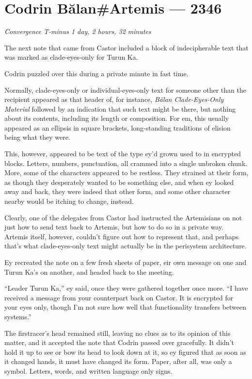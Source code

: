 \hypertarget{codrin-bux103lanartemis-2346}{%
\chapter{Codrin Bălan\#Artemis — 2346}\label{codrin-bux103lanartemis-2346}}

\begin{center}
\emph{Convergence T-minus 1 day, 2 hours, 32 minutes}
\end{center}

\noindent The next note that came from Castor included a block of indecipherable text that was marked as clade-eyes-only for Turun Ka.

Codrin puzzled over this during a private minute in fast time.

Normally, clade-eyes-only or individual-eyes-only text for someone other than the recipient appeared as that header of, for instance, \emph{Bălan Clade-Eyes-Only Material} followed by an indication that such text might be there, but nothing about its contents, including its length or composition. For em, this usually appeared as an ellipsis in square brackets, long-standing traditions of elision being what they were.

This, however, appeared to be text of the type ey'd grown used to in encrypted blocks. Letters, numbers, punctuation, all crammed into a single unbroken chunk. More, some of the characters appeared to be restless. They strained at their form, as though they desperately wanted to be something else, and when ey looked away and back, they were indeed that other form, and some other character nearby would be itching to change, instead.

Clearly, one of the delegates from Castor had instructed the Artemisians on not just how to send text back to Artemis, but how to do so in a private way. Artemis itself, however, couldn't figure out how to represent that, and perhaps that's what clade-eyes-only text might actually be in the perisystem architecture.

Ey recreated the note on a few fresh sheets of paper, eir own message on one and Turun Ka's on another, and headed back to the meeting.

``Leader Turun Ka,'' ey said, once they were gathered together once more. ``I have received a message from your counterpart back on Castor. It is encrypted for your eyes only, though I'm not sure how well that functionality transfers between systems.''

The firstracer's head remained still, leaving no clues as to its opinion of this matter, and it accepted the note that Codrin passed over gracefully. It didn't hold it up to see or bow its head to look down at it, so ey figured that as soon as it changed hands, it must have changed its form. Paper, after all, was only a symbol. Letters, words, and written language only signs.

